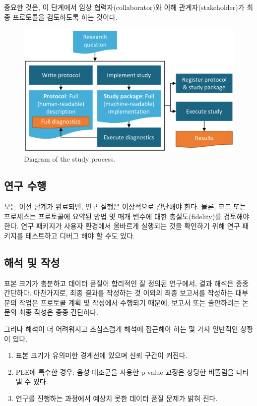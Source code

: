 \documentclass[11pt]{book}
\theoremstyle{definition}
\theoremstyle{definition}
\theoremstyle{definition}
\theoremstyle{remark}
\begin{document}
중요한 것은, 이 단계에서 임상 협력자(collaborator)와 이해
관계자(stakeholder)가 최종 프로토콜을 검토하도록 하는 것이다.

\begin{figure}

{\centering \includegraphics[width=0.9\linewidth]{images/StudySteps/studyProcess} 

}

\caption{Diagram of the study process.}\label{fig:studyProcess}
\end{figure}

\subsection{연구 수행}\label{-}

모든 이전 단계가 완료되면, 연구 실행은 이상적으로 간단해야 한다. 물론,
코드 또는 프로세스는 프로토콜에 요약된 방법 및 매개 변수에 대한
충실도(fidelity)를 검토해야 한다. 연구 패키지가 사용자 환경에서 올바르게
실행되는 것을 확인하기 위해 연구 패키지를 테스트하고 디버그 해야 할 수도
있다.

\subsection{해석 및 작성}\label{--}

표본 크기가 충분하고 데이터 품질이 합리적인 잘 정의된 연구에서, 결과
해석은 종종 간단하다. 마찬가지로, 최종 결과를 작성하는 것 이외의 최종
보고서를 작성하는 대부분의 작업은 프로토콜 계획 및 작성에서 수행되기
때문에, 보고서 또는 출판하려는 논문의 최종 작성은 종종 간단하다.

그러나 해석이 더 어려워지고 조심스럽게 해석에 접근해야 하는 몇 가지
일반적인 상황이 있다.

\begin{enumerate}
\def\labelenumi{\arabic{enumi}.}
\item
  표본 크기가 유의미한 경계선에 있으며 신뢰 구간이 커진다.
\item
  PLE에 특수한 경우: 음성 대조군을 사용한 p-value 교정은 상당한 비뚤림을
  나타낼 수 있다.
\item
  연구를 진행하는 과정에서 예상치 못한 데이터 품질 문제가 밝혀 진다.
\end{enumerate}
\end{document}

